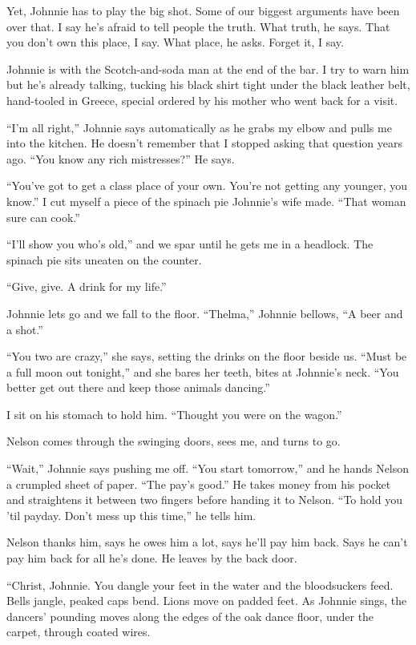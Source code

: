\documentclass[
]{article}
\begin{document}
Yet, Johnnie has to play the big shot. Some of our biggest arguments
have been over that. I say he's afraid to tell people the truth. What
truth, he says. That you don't own this place, I say. What place, he
asks. Forget it, I say.

Johnnie is with the Scotch-and-soda man at the end of the bar. I try to
warn him but he's already talking, tucking his black shirt tight under
the black leather belt, hand-tooled in Greece, special ordered by his
mother who went back for a visit.

``I'm all right,'' Johnnie says automatically as he grabs my elbow and
pulls me into the kitchen. He doesn't remember that I stopped asking
that question years ago. ``You know any rich mistresses?'' He says.

``You've got to get a class place of your own. You're not getting any
younger, you know.'' I cut myself a piece of the spinach pie Johnnie's
wife made. ``That woman sure can cook.''

``I'll show you who's old,'' and we spar until he gets me in a headlock.
The spinach pie sits uneaten on the counter.

``Give, give. A drink for my life.''

Johnnie lets go and we fall to the floor. ``Thelma,'' Johnnie bellows,
``A beer and a shot.''

``You two are crazy,'' she says, setting the drinks on the floor beside
us. ``Must be a full moon out tonight,'' and she bares her teeth, bites
at Johnnie's neck. ``You better get out there and keep those animals
dancing.''

I sit on his stomach to hold him. ``Thought you were on the wagon.''

Nelson comes through the swinging doors, sees me, and turns to go.

``Wait,'' Johnnie says pushing me off. ``You start tomorrow,'' and he
hands Nelson a crumpled sheet of paper. ``The pay's good.'' He takes
money from his pocket and straightens it between two fin­gers before
handing it to Nelson. ``To hold you 'til payday. Don't mess up this
time,'' he tells him.

Nelson thanks him, says he owes him a lot, says he'll pay him back. Says
he can't pay him back for all he's done. He leaves by the back door.

``Christ, Johnnie. You dangle your feet in the water and the
bloodsuckers feed.\\
Bells jangle, peaked caps bend. Lions move on padded feet. As Johnnie
sings, the dancers' pounding moves along the edges of the oak dance
floor, under the carpet, through coated wires.
\end{document}
